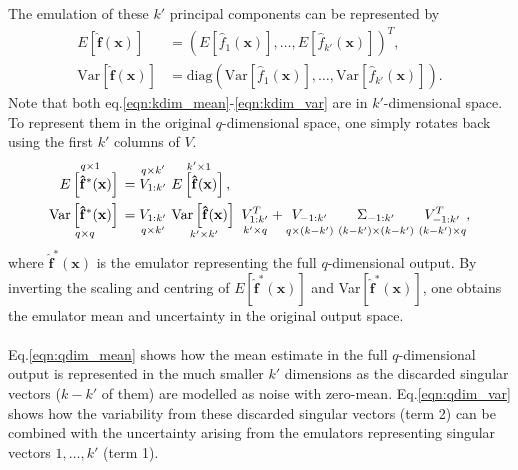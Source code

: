 \documentclass{article}
\newcommand{\numOutputs}{q}
\newcommand{\emulator}{\hat{f}}
\newcommand{\inputVec}{\mathbf{x}}
\newcommand{\RSingVecs}{V}
\newcommand{\singValMat}{\Sigma}
\newcommand{\matRank}{k}
\begin{document}
The emulation of these $\matRank'$ principal components can be represented by
\begin{align}
    E\left[\mathbf{\emulator}(\inputVec)\right] &= \left(E\left[\emulator_1(\inputVec)\right],\dots,E\left[\emulator_{\matRank'}(\inputVec)\right] \right)^T, \label{eqn:kdim_mean} \\
    \text{Var}\left[\mathbf{\emulator}(\inputVec)\right] &= \text{diag}\left(\text{Var}\left[\emulator_1(\inputVec)\right],\dots,\text{Var}\left[\emulator_{k'}(\inputVec)\right] \right). \label{eqn:kdim_var}
\end{align}
Note that both eq.\eqref{eqn:kdim_mean}-\eqref{eqn:kdim_var} are in $\matRank'$-dimensional space. To represent them in the original $\numOutputs$-dimensional space, one simply rotates back using the first $\matRank'$ columns of $\RSingVecs$.
\begin{align}
    \overset{\numOutputs \times 1}{E\left[\mathbf{\emulator}^*(\inputVec) \right] \strut}&= \overset{\numOutputs \times \matRank'}{\RSingVecs_{1:\matRank'}\strut} \ \overset{\matRank' \times 1}{E\left[\mathbf{\emulator}(\inputVec)\right] \strut},\label{eqn:qdim_mean}\\
    \underset{\numOutputs \times \numOutputs}{\text{Var}\left[\mathbf{\emulator}^*(\inputVec) \right]\strut} &= \underset{\numOutputs \times \matRank'}{\RSingVecs_{1:\matRank'}\strut} \ \underset{\matRank' \times \matRank'}{\text{Var}\left[\mathbf{\emulator}(\inputVec)\right]\strut} \ \underset{\matRank' \times \numOutputs}{\RSingVecs_{1:\matRank'}^T\strut} + \underset{\numOutputs \times (\matRank-\matRank')}{\RSingVecs_{-1:\matRank'}\strut} \ \underset{(\matRank-\matRank')\times(\matRank-\matRank')}{\singValMat_{-1:\matRank'}\strut} \ \underset{(\matRank-\matRank') \times \numOutputs}{\RSingVecs_{-1:\matRank'}^T\strut}, \label{eqn:qdim_var}
\end{align}
where $\mathbf{\emulator}^*(\inputVec)$ is the emulator representing the full $\numOutputs$-dimensional output. By inverting the scaling and centring of $E\left[\mathbf{\emulator}^*(\inputVec) \right]$ and Var$\left[\mathbf{\emulator}^*(\inputVec) \right]$, one obtains the emulator mean and uncertainty in the original output space.\\\\
Eq.\eqref{eqn:qdim_mean} shows how the mean estimate in the full $\numOutputs$-dimensional output is represented in the much smaller $\matRank'$ dimensions as the discarded singular vectors ($\matRank-\matRank'$ of them) are modelled as noise with zero-mean. Eq.\eqref{eqn:qdim_var} shows how the variability from these discarded singular vectors (term 2) can be combined with the uncertainty arising from the emulators representing singular vectors $1,\dots,\matRank'$ (term 1).\\\\
\end{document}
